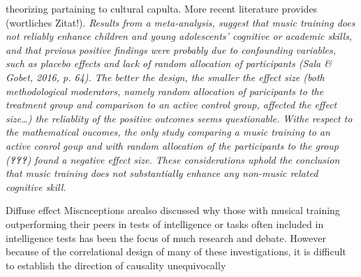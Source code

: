 \documentclass[a4, 12pt]{article}
\begin{document}
theorizing partaining to cultural capulta. More recent literature provides (wortliches Zitat!). \emph{Results from a meta-analysis, suggest that music training does not reliably enhance children and young adolescents' cognitive or academic skills, and that prvious positive findings were probably due to confounding variables, such as placebo effects and lack of random allocation of participants (Sala \& Gobet, 2016, p. 64). The better the design, the smaller the effect size (both methodological moderators, namely random allocation of paricipants to the treatment group and comparison to an active control group, affected the effect size\ldots) the reliablity of the positive outcomes seems questionable. Withe respect to the mathematical oucomes, the only study comparing a music training to an active conrol goup and with random allocation of the participants to the group ({\textbf{???}}) found a negative effect size. These considerations uphold the conclusion that music training does not substantially enhance any non-music related cognitive skill.}

Diffuse effect
Miscnceptions arealso discussed
why those with musical training outperforming their peers in tests of intelligence or tasks often included in intelligence tests has been the focus of much research and debate.
However because of the correlational design of many of these investigations, it is difficult to establish the direction of causality unequivocally
\end{document}
